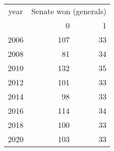 \footnotesize\begin{tabular}[t]{lrr}
\toprule
\multicolumn{1}{c}{year} & \multicolumn{2}{c}{Senate won (generals)} \\
\cmidrule(l{3pt}r{3pt}){1-1} \cmidrule(l{3pt}r{3pt}){2-3}
  & 0 & 1\\
\midrule
2006 & 107 & 33\\
2008 & 81 & 34\\
2010 & 132 & 35\\
2012 & 101 & 33\\
2014 & 98 & 33\\
2016 & 114 & 34\\
2018 & 100 & 33\\
2020 & 103 & 33\\
\bottomrule
\end{tabular}
